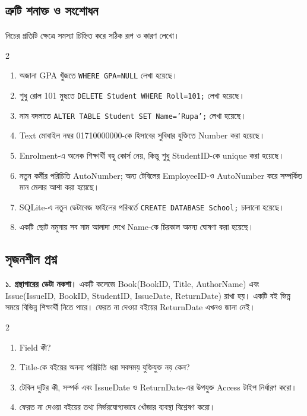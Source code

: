 \subsection{ত্রুটি শনাক্ত ও সংশোধন}
নিচের প্রতিটি ক্ষেত্রে সমস্যা চিহ্নিত করে সঠিক রূপ ও কারণ লেখো।
\begin{multicols}{2}
\small
\begin{enumerate}
\item অজানা GPA খুঁজতে \texttt{WHERE GPA=NULL} লেখা হয়েছে।
\item শুধু রোল 101 মুছতে \texttt{DELETE Student WHERE Roll=101;} লেখা হয়েছে।
\item নাম বদলাতে \texttt{ALTER TABLE Student SET Name='Rupa';} লেখা হয়েছে।
\item Text মোবাইল নম্বর 01710000000-কে হিসাবের সুবিধার যুক্তিতে Number করা হয়েছে।
\item Enrolment-এ অনেক শিক্ষার্থী বহু কোর্স নেয়, কিন্তু শুধু StudentID-কে unique করা হয়েছে।
\item নতুন কর্মীর পরিচিতি AutoNumber; অন্য টেবিলের EmployeeID-ও AutoNumber করে সম্পর্কিত মান মেলার আশা করা হয়েছে।
\item SQLite-এ নতুন ডেটাবেজ ফাইলের পরিবর্তে \texttt{CREATE DATABASE School;} চালানো হয়েছে।
\item একটি ছোট নমুনায় সব নাম আলাদা দেখে Name-কে চিরকাল অনন্য ঘোষণা করা হয়েছে।
\end{enumerate}
\end{multicols}


\subsection{সৃজনশীল প্রশ্ন}
\textbf{১. গ্রন্থাগারের ডেটা নকশা।} একটি কলেজে Book(BookID, Title, AuthorName) এবং Issue(IssueID, BookID, StudentID, IssueDate, ReturnDate) রাখা হয়। একটি বই ভিন্ন সময়ে বিভিন্ন শিক্ষার্থী নিতে পারে। ফেরত না দেওয়া বইয়ের ReturnDate এখনও জানা নেই।
\begin{multicols}{2}
\begin{enumerate}
\item[ক.] \begin{minipage}[t]{\linewidth}Field কী?
\end{minipage}
\item[খ.] \begin{minipage}[t]{\linewidth}Title-কে বইয়ের অনন্য পরিচিতি ধরা সবসময় যুক্তিযুক্ত নয় কেন?
\end{minipage}
\item[গ.] \begin{minipage}[t]{\linewidth}টেবিল দুটির কী, সম্পর্ক এবং IssueDate ও ReturnDate-এর উপযুক্ত Access টাইপ নির্ধারণ করো।
\end{minipage}
\item[ঘ.] \begin{minipage}[t]{\linewidth}ফেরত না দেওয়া বইয়ের তথ্য নির্ভরযোগ্যভাবে খোঁজার ব্যবস্থা বিশ্লেষণ করো।
\end{minipage}
\end{enumerate}
\end{multicols}

